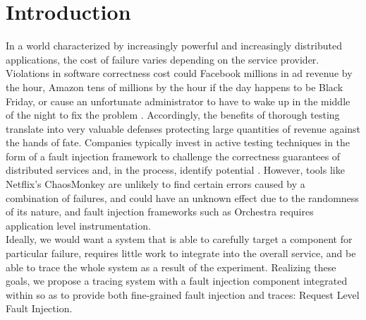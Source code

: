 

\section{Introduction}
In a world characterized by increasingly powerful and increasingly distributed applications, the cost of failure varies depending on the service provider. Violations in software correctness cost could Facebook millions in ad revenue by the hour, Amazon tens of millions by the hour if the day happens to be Black Friday, or cause an unfortunate administrator to have to wake up in the middle of the night to fix the problem . Accordingly, the benefits of thorough testing translate into very valuable defenses protecting large quantities of revenue against the hands of fate. Companies typically invest in active testing techniques in the form of a fault injection framework to challenge the correctness guarantees of distributed services and, in the process, identify potential . However, tools like Netflix's ChaosMonkey\cite{netflix:chaosmonkey} are unlikely to find certain errors caused by a combination of failures\cite{alvaro:ldfi}, and could have an unknown effect due to the randomness of its nature, and fault injection frameworks such as Orchestra\cite{orchestra} requires application level instrumentation. 
\\ \indent
Ideally, we would want a system that is able to carefully target a component for particular failure, requires little work to integrate into the overall service, and be able to trace the whole system as a result of the experiment. Realizing these goals, we propose a tracing system with a fault injection component integrated within so as to provide both fine-grained fault injection and traces: Request Level Fault Injection. 


